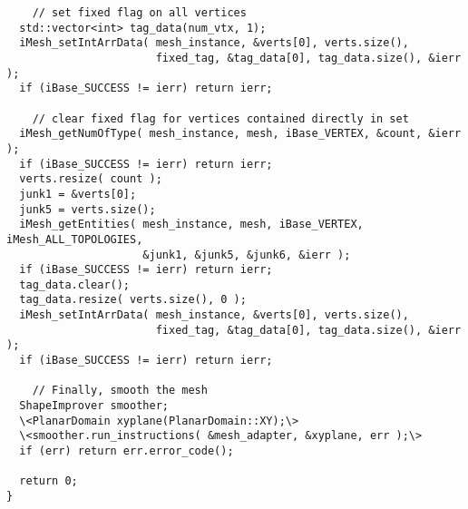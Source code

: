 \begin{lstlisting}
    // set fixed flag on all vertices
  std::vector<int> tag_data(num_vtx, 1);
  iMesh_setIntArrData( mesh_instance, &verts[0], verts.size(), 
                       fixed_tag, &tag_data[0], tag_data.size(), &ierr );
  if (iBase_SUCCESS != ierr) return ierr;

    // clear fixed flag for vertices contained directly in set
  iMesh_getNumOfType( mesh_instance, mesh, iBase_VERTEX, &count, &ierr );
  if (iBase_SUCCESS != ierr) return ierr;
  verts.resize( count );
  junk1 = &verts[0];
  junk5 = verts.size();
  iMesh_getEntities( mesh_instance, mesh, iBase_VERTEX, iMesh_ALL_TOPOLOGIES,
                     &junk1, &junk5, &junk6, &ierr );
  if (iBase_SUCCESS != ierr) return ierr;
  tag_data.clear();
  tag_data.resize( verts.size(), 0 );
  iMesh_setIntArrData( mesh_instance, &verts[0], verts.size(), 
                       fixed_tag, &tag_data[0], tag_data.size(), &ierr );
  if (iBase_SUCCESS != ierr) return ierr;

    // Finally, smooth the mesh
  ShapeImprover smoother;
  \<PlanarDomain xyplane(PlanarDomain::XY);\>
  \<smoother.run_instructions( &mesh_adapter, &xyplane, err );\>
  if (err) return err.error_code();

  return 0;
}
\end{lstlisting}

